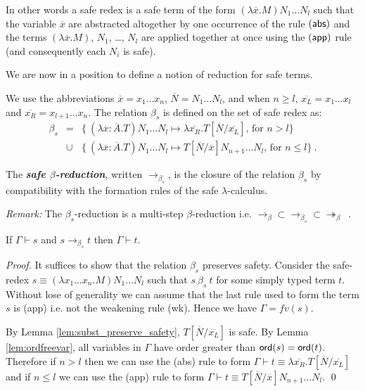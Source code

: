 \documentclass{llncs}
\newcommand\defname[1]{{\bf\em #1}\index{#1}}
\newcommand\betared{\rightarrow_\beta}
\newcommand\betasred{\rightarrow_{\beta_s}}
\newcommand\betaredtr{\twoheadrightarrow_\beta} %
\newcommand\subst[2]{\left[ #1/#2 \right]}
\newcommand\ord[1]{{\sf ord}(#1)}
\begin{document}
In other words a safe redex is a safe term of the form $(\lambda \overline{x} . M) N_1 \ldots N_l$ such that
the variable $\overline{x}$ are abstracted altogether by one occurrence of the rule $(\sf{abs})$ and the terms $(\lambda \overline{x} . M)$, $N_1$, \ldots, $N_l$ are applied together at once using the $(\sf{app})$ rule
(and consequently each $N_i$ is safe).



We are now in a position to define a notion of reduction for safe terms.

\begin{definition}
\label{dfn:safereduction} We use the
abbreviations $\overline{x} = x_1 \ldots x_n$,
$\overline{N} = N_1 \ldots N_l$, and when $n\geq l$, $\overline{x_L}
= x_1 \ldots x_l$ and $\overline{x_R} = x_{l+1} \ldots x_n$.
The relation $\beta_s$ is defined on the set of safe redex as:
\begin{eqnarray*}
\beta_s &=&
\{  \ (\lambda \overline{x} : \overline{A} . T) N_1 \ldots N_l \mapsto \lambda \overline{x_R}. T\subst{\overline{N}}{\overline{x_L}} \mbox{, for $n> l$}
\} \\
&\cup&
\{ \ (\lambda \overline{x} : \overline{A} . T) N_1 \ldots N_l \mapsto T\subst{\overline{N}}{\overline{x}} N_{n+1} \ldots N_l
\mbox{, for $n\leq l$} \} \ .
\end{eqnarray*}

The \defname{safe $\beta$-reduction}, written $\betasred$, is the closure of
the relation $\beta_s$ by compatibility with the formation rules of
the safe $\lambda$-calculus.
\end{definition}

\noindent \emph{Remark:} The $\beta_s$-reduction is a multi-step $\beta$-reduction i.e. $\betared \subset \betasred \subset \betaredtr$\ .


\begin{lemma}
\label{lem:safered_preserve_safety}
If $\Gamma \vdash s$ and $s \betasred t$ then $\Gamma \vdash t$.
\end{lemma}

\begin{proof}
It suffices to show that the relation $\beta_s$ preserves safety.
Consider the safe-redex $ s \equiv (\lambda x_1 \ldots x_n . M) N_1 \ldots N_l $ such that
$s\ \beta_s\ t$ for some simply typed term $t$.
Without lose of generality we can assume that the last rule used to form the term $s$ is {\sf(app)} i.e. not the weakening rule
{\sf(wk)}. Hence we have $\Gamma = fv(s)$.

By Lemma \ref{lem:subst_preserve_safety}, $T\subst{\overline{N}}{\overline{x_L}}$ is safe.
By Lemma \ref{lem:ordfreevar}, all variables in $\Gamma$ have order greater than $\ord{s} = \ord{t}$. Therefore
if $n>l$ then we can use the {\sf(abs)} rule to form $\Gamma \vdash t \equiv \lambda \overline{x_R}. T\subst{\overline{N}}{\overline{x_L}}$
and if $n \leq l$ we can use the {\sf(app)} rule to form $\Gamma \vdash t \equiv  T\subst{\overline{N}}{\overline{x}} N_{n+1} \ldots N_l$.
\qed
\end{proof}
\end{document}
